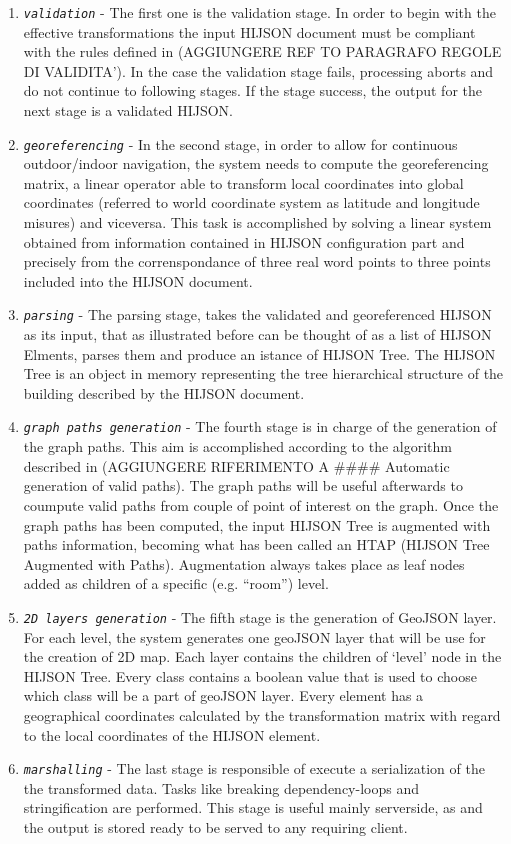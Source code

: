 \documentclass{sig-alternate}
\begin{document}
\begin{enumerate}
\def\labelenumi{\arabic{enumi}.}
\itemsep1pt\parskip0pt
\item
  \textit{\texttt{validation}} - The first one is the validation stage. In
  order to begin with the effective transformations the input HIJSON
  document must be compliant with the rules defined in (AGGIUNGERE REF
  TO PARAGRAFO REGOLE DI VALIDITA'). In the case the validation stage
  fails, processing aborts and do not continue to following stages. If
  the stage success, the output for the next stage is a validated
  HIJSON.
\item
  \textit{\texttt{georeferencing}} - In the second stage, in order to allow
  for continuous outdoor/indoor navigation, the system needs to compute
  the georeferencing matrix, a linear operator able to transform local
  coordinates into global coordinates (referred to world coordinate
  system as latitude and longitude misures) and viceversa. This task is
  accomplished by solving a linear system obtained from information
  contained in HIJSON configuration part and precisely from the
  correnspondance of three real word points to three points included
  into the HIJSON document.
\item
  \textit{\texttt{parsing}} - The parsing stage, takes the validated and
  georeferenced HIJSON as its input, that as illustrated before can be
  thought of as a list of HIJSON Elments, parses them and produce an
  istance of HIJSON Tree. The HIJSON Tree is an object in memory
  representing the tree hierarchical structure of the building described
  by the HIJSON document.
\item
  \textit{\texttt{graph paths generation}} - The fourth stage is in charge
  of the generation of the graph paths. This aim is accomplished
  according to the algorithm described in (AGGIUNGERE RIFERIMENTO A
  \#\#\#\# Automatic generation of valid paths). The graph paths will be
  useful afterwards to coumpute valid paths from couple of point of
  interest on the graph. Once the graph paths has been computed, the
  input HIJSON Tree is augmented with paths information, becoming what
  has been called an HTAP (HIJSON Tree Augmented with Paths).
  Augmentation always takes place as leaf nodes added as children of a
  specific (e.g. ``room'') level.
\item
  \textit{\texttt{2D layers generation}} - The fifth stage is the
  generation of GeoJSON layer. For each level, the system generates one
  geoJSON layer that will be use for the creation of 2D map. Each layer
  contains the children of `level' node in the HIJSON Tree. Every class
  contains a boolean value that is used to choose which class will be a
  part of geoJSON layer. Every element has a geographical coordinates
  calculated by the transformation matrix with regard to the local
  coordinates of the HIJSON element.
\item
  \textit{\texttt{marshalling}} - The last stage is responsible of execute
  a serialization of the the transformed data. Tasks like breaking
  dependency-loops and stringification are performed. This stage is
  useful mainly serverside, as and the output is stored ready to be
  served to any requiring client.
\end{enumerate}
\end{document}
